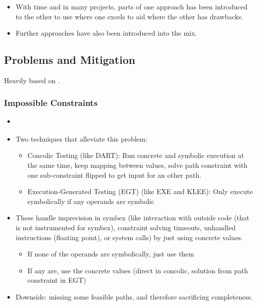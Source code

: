 \documentclass{article}
\begin{document}
\begin{itemize}
\begin{itemize}
              \item {}\cite{EvaluatingFuzzTesting}
          \end{itemize}
    \item With time and in many projects, parts of one approach has been introduced to the other to use where one excels to aid where the other has drawbacks.
    \item Further approaches have also been introduced into the mix.
\end{itemize}

\subsection{Problems and Mitigation}
Heavily based on \cite{ReviewThreeDecades}.

\subsubsection{Impossible Constraints}
\begin{itemize}
    \item {}\cite{ReviewThreeDecades}
    \item Two techniques that alleviate this problem:
          \begin{itemize}
              \item Concolic Testing (like DART\cite{DART}): Run concrete and symbolic execution at the same time, keep mapping between values, solve path constraint with one sub-constraint flipped to get input for an other path.
              \item Execution-Generated Testing (EGT) (like EXE\cite{EXE} and KLEE\cite{KLEE}): Only execute symbolically if any operands are symbolic
          \end{itemize}
    \item These handle imprecision in symbex (like interaction with outside code (that is not instrumented for symbex), constraint solving timeouts, unhandled instructions (floating point), or system calls) by just using concrete values.
          \begin{itemize}
              \item If none of the operands are symbolically, just use them
              \item If any are, use the concrete values (direct in concolic, solution from path constraint in EGT)
          \end{itemize}
    \item Downside: missing some feasible paths, and therefore sacrificing completeness.
\end{itemize}
\end{document}
